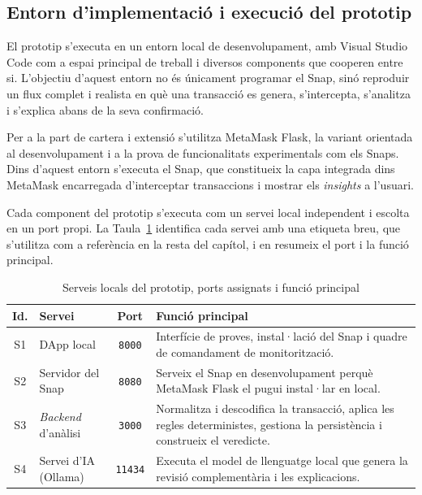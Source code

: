 \subsection{Entorn d’implementació i execució del prototip}

El prototip s’executa en un entorn local de desenvolupament, amb Visual Studio Code com a espai principal de treball i diversos components que cooperen entre si. L’objectiu d’aquest entorn no és únicament programar el Snap, sinó reproduir un flux complet i realista en què una transacció es genera, s’intercepta, s’analitza i s’explica abans de la seva confirmació.

Per a la part de cartera i extensió s’utilitza MetaMask Flask, la variant orientada al desenvolupament i a la prova de funcionalitats experimentals com els Snaps. Dins d’aquest entorn s’executa el Snap, que constitueix la capa integrada dins MetaMask encarregada d’interceptar transaccions i mostrar els \textit{insights} a l’usuari.

Cada component del prototip s’executa com un servei local independent i escolta en un port propi. La Taula~\ref{tab:serveis_ports} identifica cada servei amb una etiqueta breu, que s’utilitza com a referència en la resta del capítol, i en resumeix el port i la funció principal.

\begin{table}[H]
\centering
\small
\renewcommand{\arraystretch}{1.4}
\setlength{\tabcolsep}{9pt}
\begin{tabularx}{\textwidth}{c | p{} | c | X}
\hline
\textbf{Id.} & \textbf{Servei} & \textbf{Port} & \textbf{Funció principal} \\
\hline
S1 & DApp local & \texttt{8000} &
Interfície de proves, instal·lació del Snap i quadre de comandament de monitorització. \\
\hline
S2 & Servidor del Snap & \texttt{8080} &
Serveix el Snap en desenvolupament perquè MetaMask Flask el pugui instal·lar en local. \\
\hline
S3 & \textit{Backend} d’anàlisi & \texttt{3000} &
Normalitza i descodifica la transacció, aplica les regles deterministes, gestiona la persistència i construeix el veredicte. \\
\hline
S4 & Servei d’IA (Ollama) & \texttt{11434} &
Executa el model de llenguatge local que genera la revisió complementària i les explicacions. \\
\hline
\end{tabularx}
\caption{Serveis locals del prototip, ports assignats i funció principal}
\label{tab:serveis_ports}
\end{table}

